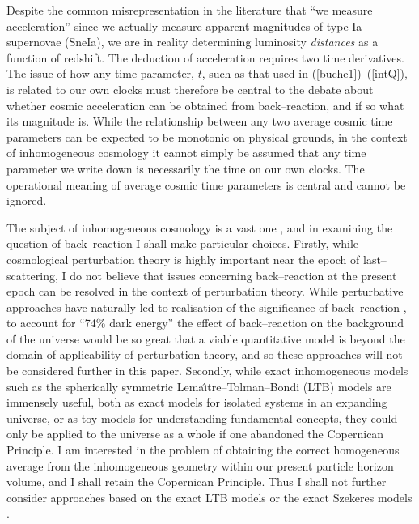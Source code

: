 \documentclass[12pt]{article}
\begin{document}
Despite the common misrepresentation in the literature that ``we
measure acceleration'' since we actually measure apparent magnitudes of
type Ia supernovae (SneIa), we are in reality determining luminosity {\em
distances} as a function of redshift. The deduction of acceleration requires
two time derivatives. The issue of how any time parameter, $t$, such as
that used in (\ref{buche1})--(\ref{intQ}), is related to our own clocks
must therefore be central to the debate about whether cosmic acceleration
can be obtained from back--reaction, and if so what its magnitude is.
While the relationship between any two average cosmic time parameters
can be expected to be monotonic on physical grounds, in the context of
inhomogeneous cosmology it cannot simply be assumed that any time parameter
we write down is necessarily the time on our own clocks. The operational
meaning of average cosmic time parameters is central and cannot be ignored.

The subject of inhomogeneous cosmology is a vast one \cite{Krasinski},
and in examining the question of back--reaction I shall make particular
choices. Firstly, while cosmological perturbation theory is highly
important near the epoch of last--scattering, I do not believe that
issues concerning back--reaction at the present epoch can be resolved
in the context of perturbation theory. While perturbative approaches have
naturally led to realisation of the significance of back--reaction
\cite{kolb2}, to account for ``74\% dark energy'' the effect of
back--reaction on the background of the universe would be so great that
a viable quantitative model is beyond the domain of applicability of
perturbation theory, and so these approaches will not be considered further
in this paper. Secondly, while exact inhomogeneous models such as the
spherically symmetric Lema\^{\i}tre--Tolman--Bondi (LTB) models
\cite{LT,Bondi} are immensely useful, both as exact models for isolated
systems in an expanding universe, or as toy models for understanding
fundamental concepts, they could only be applied to the universe as a whole
if one abandoned the Copernican Principle. I am interested in the problem
of obtaining the correct homogeneous average from the inhomogeneous
geometry within our present particle horizon volume, and I shall retain the
Copernican Principle. Thus I shall not further consider approaches based on
the exact LTB models \cite{LT,Bondi} or the exact Szekeres models
\cite{Szek}.
\end{document}
